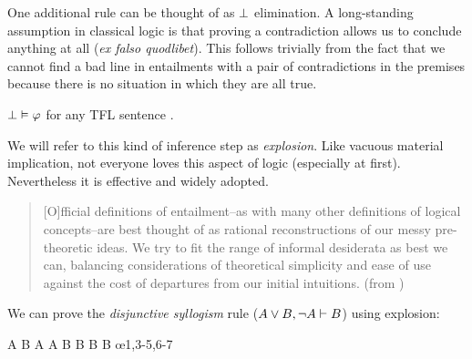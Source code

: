 One additional rule can be thought of as $\bot$ elimination. A long-standing
assumption in classical logic is that proving a contradiction allows us to
conclude anything at all (\emph{ex falso quodlibet}). This follows trivially
from the fact that we cannot find a bad line in entailments with a pair of
contradictions in the premises because there is no situation in which they are
all true.

\begin{argument}
  \item[\textbf{X:}] $\bot\vDash\varphi$ for any TFL sentence \ephi.
\end{argument}

We will refer to this kind of inference step as \emph{explosion}. Like vacuous
material implication, not everyone loves this aspect of logic (especially at
first). Nevertheless it is effective and widely adopted.

\begin{quote}
  [O]fficial definitions of entailment--as with many other definitions of
  logical concepts--are best thought of as rational reconstructions of our
  messy pre-theoretic ideas. We try to fit the range of informal desiderata as
  best we can, balancing considerations of theoretical simplicity and ease of
  use against the cost of departures from our initial intuitions.
  (from \cite[][p. 145]{Smi20})
\end{quote}

\begin{fitchrule}[Explosion]
  \label{def:explosion-rule}
  \leavevmode
  \vspace{-0.9\baselineskip}
  \begin{fitchproof}
     {\ebot}
     {\ephi} 
  \end{fitchproof}
\end{fitchrule}

We can prove the \emph{disjunctive syllogism} rule
($A \vee B, \neg A \vdash B$) using explosion:

\begin{fitchproof}
   {A \eor B} 
   {\not A}   
  \open
   {A}        
   {\ebot}    
   {B}        
  \close
  \open
   {B}        
   {B}        
  \close
   {B}        \oe{1,3-5,6-7}
\end{fitchproof}

